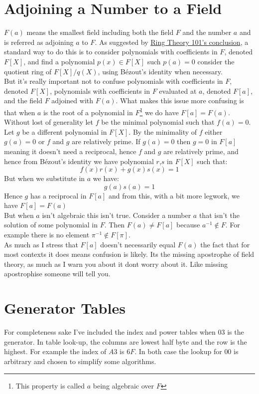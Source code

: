 \section{Adjoining a Number to a Field}
\label{appx:adjoining}
$F(a)$ means the smallest field including both the field $F$ and the number $a$ and is referred as adjoining $a$ to $F$.
As suggested by \hyperref[appx:ring-conclusion]{Ring Theory 101's conclusion}, a standard way to do this is to consider polynomials with coefficients in $F$, denoted $F[X]$, and find a polynomial $p(x)\in F[X]$ such $p(a)=0$ consider the quotient ring of $F[X]/q(X)$,
using Bézout's identity when necessary.
\\

But it's really important not to confuse polynomials with coefficients in $F$, denoted $F[X]$, polynomials with coefficients in $F$ evaluated at $a$, denoted $F[a]$, and the field $F$ adjoined with $F(a)$.
What makes this issue more confusing is that when $a$ is the root of a polynomial in $F$\footnote{This property is called $a$ being algebraic over $F$} we do have $F[a]=F(a)$.
\\

Without lost of generality let $f$ be the minimal polynomial such that $f(a)=0$.
Let $g$ be a different polynomial in $F[X]$.
By the minimality of $f$ either $g(a)=0$ or $f$ and $g$ are relatively prime.
If $g(a)=0$ then $g=0$ in $F[a]$ meaning it doesn't need a reciprocal,
hence $f$ and $g$ are relatively prime,
and hence from Bézout's identity we have polynomial $r$,$s$ in $F[X]$ such that:
\[f(x)r(x)+g(x)s(x) = 1\]
But when we substitute in $a$ we have:
\[g(a)s(a) = 1\]
Hence $g$ has a reciprocal in $F[a]$ and from this, with a bit more legwork, we have $F[a] = F(a)$
\\

But when $a$ isn't algebraic this isn't true.
Consider a number $a$ that isn't the solution of some polynomial in $F$.
Then $F(a) \neq F[a]$ because $a^{-1} \not \in F$.
For example there is no element $\pi^{-1}\not\in F[\pi]$.
\\

As much as I stress that $F[a]$ doesn't necessarily equal $F(a)$ the fact that for most contexts it does means confusion is likely.
Its the missing apostrophe of field theory,
as much as I warn you about it dont worry about it.
Like missing apostrophise someone will tell you.

\section{Generator Tables}
\label{appx:gen-table}
For completeness sake I've included the index and power tables when $03$ is the generator.
In table look-up, the columns are lowest half byte and the row is the highest.
For example the index of $A3$ is $6F$.
In both case the lookup for $00$ is arbitrary and chosen to simplify some algorithms.

